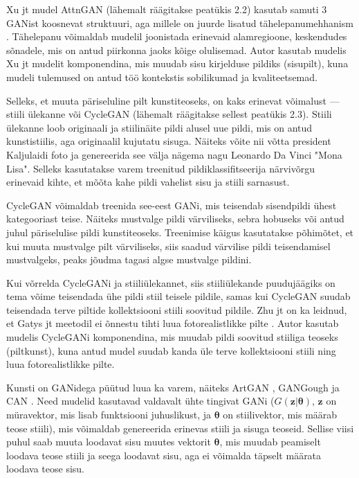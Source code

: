 \documentclass{vilgym}
\begin{document}
	Xu jt mudel AttnGAN (lähemalt räägitakse peatükis 2.2) kasutab samuti 3 GANist koosnevat struktuuri, aga millele on juurde lisatud tähelepanumehhanism  \parencite{attngan}. Tähelepanu võimaldab mudelil joonistada erinevaid alamregioone, keskendudes sõnadele, mis on antud piirkonna jaoks kõige olulisemad. Autor kasutab mudelis Xu jt mudelit komponendina, mis muudab sisu kirjelduse pildiks (sisu\textrightarrow pilt), kuna mudeli tulemused on antud töö kontekstis sobilikumad ja kvaliteetsemad.

	Selleks, et muuta päriseluline pilt kunstiteoseks, on kaks erinevat võimalust --- stiili ülekanne  või CycleGAN (lähemalt räägitakse sellest peatükis 2.3). Stiili ülekanne loob originaali ja stiilinäite pildi alusel uue pildi, mis on antud kunstistiilis, aga originaalil kujutatu sisuga. Näiteks võite nii võtta president Kaljulaidi foto ja genereerida see välja nägema nagu Leonardo Da Vinci "Mona Lisa". Selleks kasutatakse varem treenitud pildiklassifitseerija närvivõrgu erinevaid kihte, et mõõta kahe pildi vahelist sisu ja stiili sarnasust. \parencite{styletransfer}

	CycleGAN võimaldab treenida see-eest GANi, mis teisendab sisendpildi ühest kategooriast teise. Näiteks mustvalge pildi värviliseks, sebra hobuseks või antud juhul päriselulise pildi kunstiteoseks. Treenimise käigus kasutatakse põhimõtet, et kui muuta mustvalge pilt värviliseks, siis saadud värvilise pildi teisendamisel mustvalgeks, peaks jõudma tagasi algse mustvalge pildini. \parencite{cyclegan}

	Kui võrrelda CycleGANi ja stiiliülekannet, siis stiiliülekande puudujäägiks on tema võime teisendada ühe pildi stiil teisele pildile, samas kui CycleGAN suudab teisendada terve piltide kollektsiooni stiili soovitud pildile. Zhu jt on ka leidnud, et Gatys jt meetodil ei õnnestu tihti luua fotorealistlikke pilte \parencite{cyclegan, styletransfer}. Autor kasutab mudelis CycleGANi komponendina, mis muudab pildi soovitud stiiliga teoseks (pilt\textrightarrow kunst), kuna antud mudel suudab kanda üle terve kollektsiooni stiili ning luua fotorealistlikke pilte.

	Kunsti on GANidega püütud luua ka varem, näiteks ArtGAN \parencite{artgan}, GANGough \parencite{gangough} ja CAN \parencite{can}. Need mudelid kasutavad valdavalt ühte tingivat GANi ($ G(\boldsymbol{z}|\boldsymbol{\theta}) $, $ \boldsymbol{z} $ on müravektor, mis lisab funktsiooni juhuslikust, ja $ \boldsymbol{\theta} $ on stiilivektor, mis määrab teose stiili), mis võimaldab genereerida erinevas stiili ja sisuga teoseid. Sellise viisi puhul saab muuta loodavat sisu muutes vektorit $ \boldsymbol{\theta} $, mis muudab peamiselt loodava teose stiili ja seega loodavat sisu, aga ei võimalda täpselt määrata loodava teose sisu. 
\end{document}

